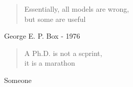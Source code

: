 \documentclass[a4paper,12pt,twoside,english]{book}
\begin{document}
\begin{quote}
	Essentially, all models are wrong, \\ but some are useful\end{quote} \bigbreak

\hfill 
George E. P. Box - 1976

\vspace*{0.1\textheight}

\begin{quote}
	A Ph.D. is not a scprint, \\ it is a marathon\end{quote} \bigbreak

\hfill 
Someone






\tableofcontents %
\listoffigures %
\listoftables %






\mainmatter
\setlength{\parskip}{.7em}

\renewcommand{\baselinestretch}{1.1}

\fancyhead[RO]{\leftmark}
\fancyhead[LE]{\textsc{\chaptername~\thechapter}}
\end{document}
